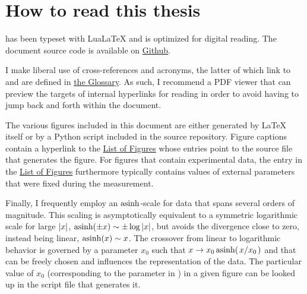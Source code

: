 \chapter*{How to read this thesis}

\Thethesis has been typeset with Lua\LaTeX{} and is optimized for digital reading.
The document source code is available on \href{https://github.com/thangleiter/phd_thesis/}{Github}.

I make liberal use of cross-references and acronyms, the latter of which link to and are defined in \hyperref[glo]{the Glossary}.
As such, I recommend a PDF viewer that can preview the targets of internal hyperlinks for reading \thethesis in order to avoid having to jump back and forth within the document.

The various figures included in this document are either generated by \LaTeX{} itself or by a Python script included in the source repository.
Figure captions contain a hyperlink to the \hyperref[lof]{List of Figures} whose entries point to the source file that generates the figure.
For figures that contain experimental data, the entry in the \hyperref[lof]{List of Figures} furthermore typically contains values of external parameters that were fixed during the measurement.

Finally, I frequently employ an $\operatorname{asinh}$-scale for data that spans several orders of magnitude.
This scaling is asymptotically equivalent to a symmetric logarithmic scale for large $\abs{x}$, $\operatorname{asinh}(\pm x)\sim\pm\log\abs{x}$, but avoids the divergence close to zero, instead being linear, $\operatorname{asinh}(x)\sim x$.
The crossover from linear to logarithmic behavior is governed by a parameter $x_0$ such that $x\to x_0\asinh(\flatfrac{x}{x_0})$ and that can be freely chosen and influences the representation of the data.
The particular value of $x_0$ (corresponding to the  parameter in \href{https://matplotlib.org/stable/gallery/scales/asinh_demo.html}{\matplotlib}) in a given figure can be looked up in the script file that generates it.
